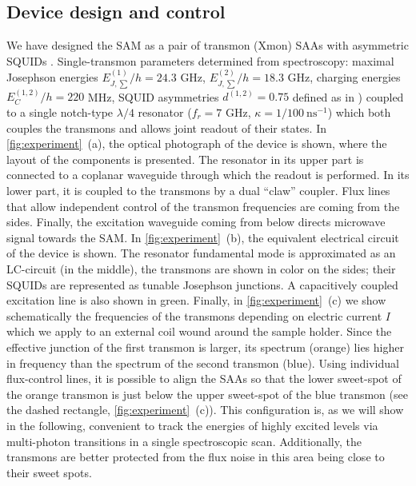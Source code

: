 \documentclass[%
 aps, prx,
 amsmath,amssymb,
 reprint,%
superscriptaddress
]{revtex4-2}
\begin{document}
\subsection{Device design and control}
We have designed the SAM as a pair of transmon 
(Xmon) SAAs with asymmetric 
SQUIDs \cite{hutchings2017tunable}. Single-transmon parameters determined from spectroscopy: maximal Josephson energies $E^{(1)}_{J, 
\sum}/h = 24.3$ GHz, $E^{(2)}_{J,\sum}/h = 18.3$ GHz, 
charging energies $E^{(1,2)}_C/h = 220$ MHz, SQUID asymmetries $d^{(1,2)} = 0.75$ defined as in \cite{koch2007charge}) coupled 
to a single notch-type \cite{probst2015efficient} 
$\lambda/4$ resonator ($f_r = 7$ GHz, $\kappa = 
1/100\ \text{ns}^{-1}$) which both 
couples \cite{majer2007coupling} the transmons and 
allows joint readout  \cite{chow2010detecting} of 
their states. In \autoref{fig:experiment}~(a), 
the optical photograph of the device is shown, where the layout of the components is presented. The 
resonator in its upper part is connected to a 
coplanar waveguide through which the readout is 
performed. In its lower part, it is coupled to 
the transmons by a dual 
``claw'' \cite{barends2013coherent} coupler. Flux 
lines that allow independent control of the 
transmon frequencies are coming from the sides. 
Finally, the excitation waveguide coming from 
below directs microwave signal towards the SAM. 
In \autoref{fig:experiment}~(b), the equivalent 
electrical circuit of the device is shown. The 
resonator fundamental mode is approximated as an 
LC-circuit (in the middle), the transmons are 
shown in color on the sides; their SQUIDs are 
represented as tunable Josephson junctions. A 
capacitively coupled excitation line is also 
shown in green. Finally, in 
\autoref{fig:experiment}~(c) we show 
schematically the frequencies of the transmons 
depending on electric current $I$ which we apply 
to an external coil wound around the sample 
holder. Since the effective junction of the first 
transmon is larger, its spectrum (orange) lies 
higher in frequency than the spectrum of the 
second transmon (blue). Using individual 
flux-control lines, it is possible to align the 
SAAs so that the lower sweet-spot of the orange 
transmon is just below the upper sweet-spot of 
the blue transmon (see the dashed rectangle,  
\autoref{fig:experiment}~(c)). This configuration 
is, as we will show in the following, convenient 
to track the energies of highly excited levels 
via multi-photon transitions in a single 
spectroscopic scan. Additionally, the transmons 
are better protected from the flux noise in this 
area being close to their sweet spots.
\end{document}
